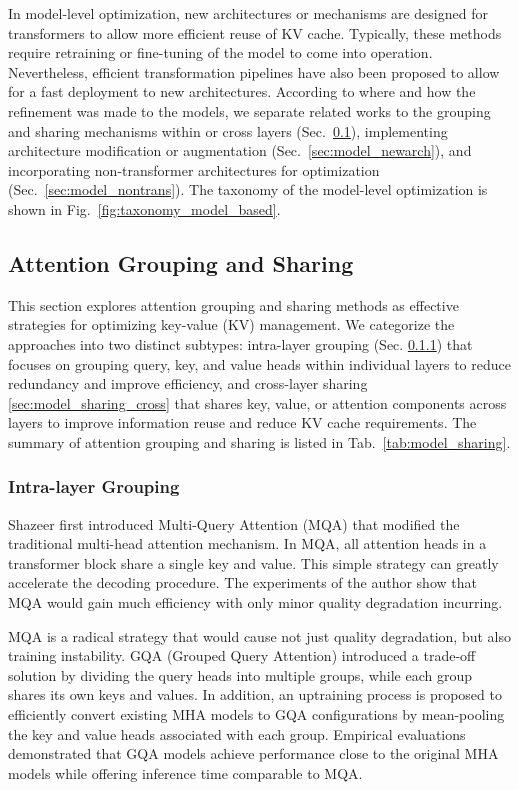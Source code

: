 In model-level optimization, new architectures or mechanisms are designed for transformers to allow more efficient reuse of KV cache. Typically, these methods require retraining or fine-tuning of the model to come into operation. Nevertheless, efficient transformation pipelines have also been proposed to allow for a fast deployment to new architectures. According to where and how the refinement was made to the models, we separate related works to the grouping and sharing mechanisms within or cross layers (Sec.~\ref{sec:model_sharing}), implementing architecture modification or augmentation (Sec.~\ref{sec:model_newarch}), and incorporating non-transformer architectures for optimization (Sec.~\ref{sec:model_nontrans}).
The taxonomy of the model-level optimization is shown in Fig.~\ref{fig:taxonomy_model_based}.



\subsection{Attention Grouping and Sharing}\label{sec:model_sharing}

This section explores attention grouping and sharing methods as effective strategies for optimizing key-value (KV) management. We categorize the approaches into two distinct subtypes: intra-layer grouping (Sec. \ref{sec:model_sharing_intra}) that focuses on grouping query, key, and value heads within individual layers to reduce redundancy and improve efficiency, and cross-layer sharing \ref{sec:model_sharing_cross} that shares key, value, or attention components across layers to improve information reuse and reduce KV cache requirements.
The summary of attention grouping and sharing is listed in Tab.~\ref{tab:model_sharing}.

\subsubsection{Intra-layer Grouping}\label{sec:model_sharing_intra}

Shazeer first introduced Multi-Query Attention (MQA) \cite{shazeerFastTransformerDecoding2019} that modified the traditional multi-head attention mechanism. In MQA, all attention heads in a transformer block share a single key and value. This simple strategy can greatly accelerate the decoding procedure. The experiments of the author show that MQA would gain much efficiency with only minor quality degradation incurring.

MQA is a radical strategy that would cause not just quality degradation, but also training instability.  GQA (Grouped Query Attention) \cite{ainslieGQATrainingGeneralized2023} introduced a trade-off solution by dividing the query heads into multiple groups, while each group shares its own keys and values. In addition, an uptraining process is proposed to efficiently convert existing MHA models to GQA configurations by mean-pooling the key and value heads associated with each group. Empirical evaluations demonstrated that GQA models achieve performance close to the original MHA models while offering inference time comparable to MQA.


